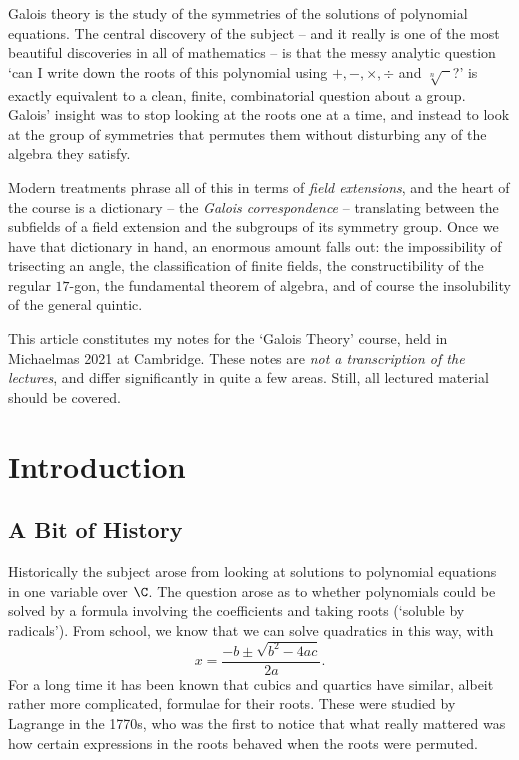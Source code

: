 



Galois theory is the study of the symmetries of the solutions of polynomial equations. The central discovery of the subject -- and it really is one of the most beautiful discoveries in all of mathematics -- is that the messy analytic question `can I write down the roots of this polynomial using $+, -, \times, \div$ and $\sqrt[n]{\phantom{x}}$?' is exactly equivalent to a clean, finite, combinatorial question about a group. Galois' insight was to stop looking at the roots one at a time, and instead to look at the group of symmetries that permutes them without disturbing any of the algebra they satisfy.

Modern treatments phrase all of this in terms of \emph{field extensions}, and the heart of the course is a dictionary -- the \emph{Galois correspondence} -- translating between the subfields of a field extension and the subgroups of its symmetry group. Once we have that dictionary in hand, an enormous amount falls out: the impossibility of trisecting an angle, the classification of finite fields, the constructibility of the regular $17$-gon, the fundamental theorem of algebra, and of course the insolubility of the general quintic.

This article constitutes my notes for the `Galois Theory' course, held in Michaelmas 2021 at Cambridge. These notes are \emph{not a transcription of the lectures}, and differ significantly in quite a few areas. Still, all lectured material should be covered.



\section{Introduction}

\subsection{A Bit of History}

Historically the subject arose from looking at solutions to polynomial equations in one variable over $\C$. The question arose as to whether polynomials could be solved by a formula involving the coefficients and taking roots (`soluble by radicals'). From school, we know that we can solve quadratics in this way, with
$$x = \frac{-b \pm \sqrt{b^2 - 4ac}}{2a}.$$
For a long time it has been known that cubics and quartics have similar, albeit rather more complicated, formulae for their roots. These were studied by Lagrange in the 1770s, who was the first to notice that what really mattered was how certain expressions in the roots behaved when the roots were permuted.

